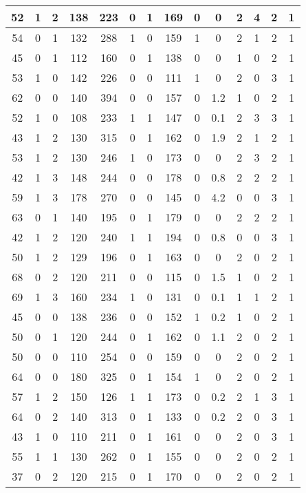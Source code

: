 \documentclass{article}
\begin{document}
\begin{longtable}{|c|c|c|c|c|c|c|c|c|c|c|c|c|c|}
52 & 1 & 2 & 138 & 223 & 0 & 1 & 169 & 0 & 0 & 2 & 4 & 2 & 1\\ \hline
54 & 0 & 1 & 132 & 288 & 1 & 0 & 159 & 1 & 0 & 2 & 1 & 2 & 1\\ \hline
45 & 0 & 1 & 112 & 160 & 0 & 1 & 138 & 0 & 0 & 1 & 0 & 2 & 1\\ \hline
53 & 1 & 0 & 142 & 226 & 0 & 0 & 111 & 1 & 0 & 2 & 0 & 3 & 1\\ \hline
62 & 0 & 0 & 140 & 394 & 0 & 0 & 157 & 0 & 1.2 & 1 & 0 & 2 & 1\\ \hline
52 & 1 & 0 & 108 & 233 & 1 & 1 & 147 & 0 & 0.1 & 2 & 3 & 3 & 1\\ \hline
43 & 1 & 2 & 130 & 315 & 0 & 1 & 162 & 0 & 1.9 & 2 & 1 & 2 & 1\\ \hline
53 & 1 & 2 & 130 & 246 & 1 & 0 & 173 & 0 & 0 & 2 & 3 & 2 & 1\\ \hline
42 & 1 & 3 & 148 & 244 & 0 & 0 & 178 & 0 & 0.8 & 2 & 2 & 2 & 1\\ \hline
59 & 1 & 3 & 178 & 270 & 0 & 0 & 145 & 0 & 4.2 & 0 & 0 & 3 & 1\\ \hline
63 & 0 & 1 & 140 & 195 & 0 & 1 & 179 & 0 & 0 & 2 & 2 & 2 & 1\\ \hline
42 & 1 & 2 & 120 & 240 & 1 & 1 & 194 & 0 & 0.8 & 0 & 0 & 3 & 1\\ \hline
50 & 1 & 2 & 129 & 196 & 0 & 1 & 163 & 0 & 0 & 2 & 0 & 2 & 1\\ \hline
68 & 0 & 2 & 120 & 211 & 0 & 0 & 115 & 0 & 1.5 & 1 & 0 & 2 & 1\\ \hline
69 & 1 & 3 & 160 & 234 & 1 & 0 & 131 & 0 & 0.1 & 1 & 1 & 2 & 1\\ \hline
45 & 0 & 0 & 138 & 236 & 0 & 0 & 152 & 1 & 0.2 & 1 & 0 & 2 & 1\\ \hline
50 & 0 & 1 & 120 & 244 & 0 & 1 & 162 & 0 & 1.1 & 2 & 0 & 2 & 1\\ \hline
50 & 0 & 0 & 110 & 254 & 0 & 0 & 159 & 0 & 0 & 2 & 0 & 2 & 1\\ \hline
64 & 0 & 0 & 180 & 325 & 0 & 1 & 154 & 1 & 0 & 2 & 0 & 2 & 1\\ \hline
57 & 1 & 2 & 150 & 126 & 1 & 1 & 173 & 0 & 0.2 & 2 & 1 & 3 & 1\\ \hline
64 & 0 & 2 & 140 & 313 & 0 & 1 & 133 & 0 & 0.2 & 2 & 0 & 3 & 1\\ \hline
43 & 1 & 0 & 110 & 211 & 0 & 1 & 161 & 0 & 0 & 2 & 0 & 3 & 1\\ \hline
55 & 1 & 1 & 130 & 262 & 0 & 1 & 155 & 0 & 0 & 2 & 0 & 2 & 1\\ \hline
37 & 0 & 2 & 120 & 215 & 0 & 1 & 170 & 0 & 0 & 2 & 0 & 2 & 1\\ \hline

\end{longtable}
\end{document}
